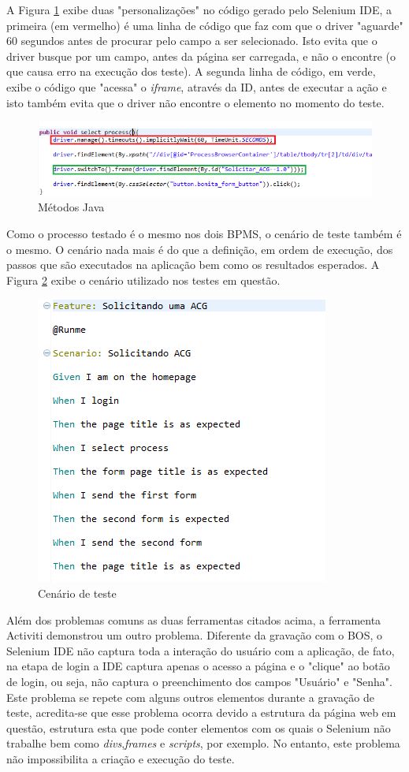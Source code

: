 \documentclass[12pt]{article}
\begin{document}
A Figura \ref{fig:codigobos} exibe duas "personalizações" no código gerado pelo Selenium IDE, a primeira (em vermelho) é uma linha de código que faz com que o driver "aguarde"  60 segundos antes de procurar pelo campo a ser selecionado. Isto evita que o driver busque por um campo, antes da página ser carregada, e não o encontre (o que causa erro na execução dos teste). A segunda linha de código, em verde, exibe o código que "acessa" o \emph{iframe}, através da ID, antes de executar a ação e isto também evita que o driver não encontre o elemento no momento do teste.

\begin{figure}[ht]
\centering
\includegraphics[width=.99\textwidth]{figuras/codigo.png}
\caption{Métodos Java}
\label{fig:codigobos}
\end{figure}

Como o processo testado é o mesmo nos dois BPMS, o cenário de teste também é o mesmo. O cenário nada mais é do que a definição, em ordem de execução, dos passos que são executados na aplicação bem como  os resultados esperados. A Figura \ref{fig:cenariobos} exibe o cenário utilizado nos testes em questão.

\begin{figure}[ht]
\centering
\includegraphics[width=.50\textwidth]{figuras/cenario.png}
\caption{Cenário de teste}
\label{fig:cenariobos}
\end{figure}

Além dos problemas comuns as duas ferramentas citados acima, a ferramenta Activiti demonstrou um outro problema. Diferente da gravação com o BOS, o Selenium IDE não captura toda a interação do usuário com a aplicação, de fato, na etapa de login a IDE captura apenas o acesso a página e o "clique" ao botão de login, ou seja, não captura o preenchimento dos campos "Usuário" e "Senha". Este problema se repete com alguns outros elementos durante a gravação de teste, acredita-se que esse problema ocorra devido a estrutura da página web em questão, estrutura esta que pode conter elementos com os quais o Selenium não trabalhe bem como \emph{divs},\emph{frames} e \emph{scripts}, por exemplo. No entanto, este problema não impossibilita a criação e execução do teste.
\end{document}
